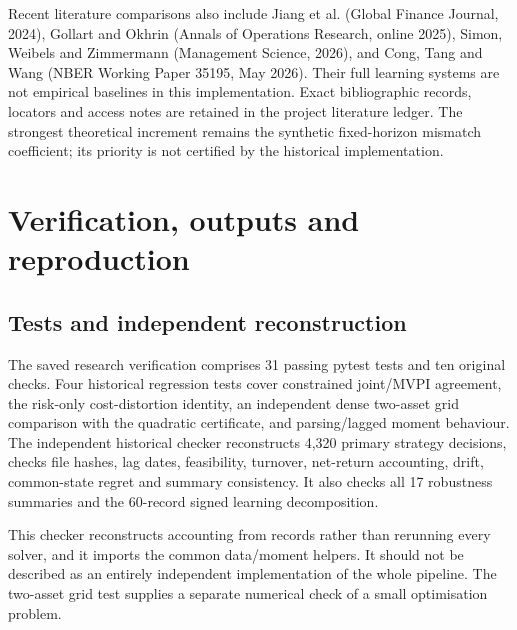 \documentclass[11pt,a4paper]{article}
\begin{document}
Recent literature comparisons also include Jiang et al. (Global Finance Journal, 2024), Gollart and Okhrin (Annals of Operations Research, online 2025), Simon, Weibels and Zimmermann (Management Science, 2026), and Cong, Tang and Wang (NBER Working Paper 35195, May 2026). Their full learning systems are not empirical baselines in this implementation. Exact bibliographic records, locators and access notes are retained in the project literature ledger. The strongest theoretical increment remains the synthetic fixed-horizon mismatch coefficient; its priority is not certified by the historical implementation.

\section{Verification, outputs and reproduction}
\subsection{Tests and independent reconstruction}
The saved research verification comprises 31 passing pytest tests and ten original checks. Four historical regression tests cover constrained joint/MVPI agreement, the risk-only cost-distortion identity, an independent dense two-asset grid comparison with the quadratic certificate, and parsing/lagged moment behaviour. The independent historical checker reconstructs 4,320 primary strategy decisions, checks file hashes, lag dates, feasibility, turnover, net-return accounting, drift, common-state regret and summary consistency. It also checks all 17 robustness summaries and the 60-record signed learning decomposition.

This checker reconstructs accounting from records rather than rerunning every solver, and it imports the common data/moment helpers. It should not be described as an entirely independent implementation of the whole pipeline. The two-asset grid test supplies a separate numerical check of a small optimisation problem.
\end{document}
